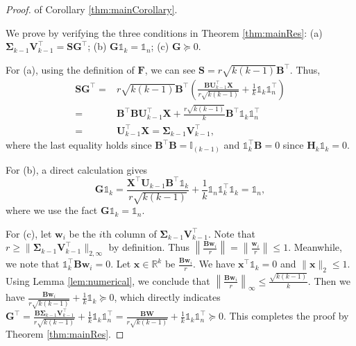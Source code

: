 \documentclass[journal]{IEEEtran}
\begin{document}
\begin{figure}[omitted: a diagram of this paper's results, not reproduced here]\end{figure}

\begin{proof} of Corollary \ref{thm:mainCorollary}.
	
	We prove by verifying the three conditions in Theorem \ref{thm:mainRes}: (a) $\mathbf{\Sigma}_{k-1}\mathbf{V}_{k-1}^\top=\mathbf{S}\mathbf{G}^\top$; 
	(b) $\mathbf{G}\mathbb{1}_k = \mathbb{1}_n$;
	(c) $\mathbf{G}\succeq 0$.
	
	For (a), using the definition of $\mathbf{F}$, we can see $\mathbf{S} = r\sqrt{k(k-1)}\mathbf{B}^\top$.
	Thus, 
	\[
	\begin{aligned}
	\mathbf{SG}^\top =& r\sqrt{k(k-1)}\mathbf{B}^\top \left(\frac{\mathbf{B}\mathbf{U}_{k-1}^\top\mathbf{X}}{r\sqrt{k(k-1)}}+\frac{1}{k}\mathbb{1}_k\mathbb{1}_n^\top\right) \\
	=& \mathbf{B}^\top\mathbf{B}\mathbf{U}_{k-1}^\top\mathbf{X}+\frac{r\sqrt{k(k-1)}}{k}\mathbf{B}^\top\mathbb{1}_k\mathbb{1}_n^\top \\
	=& \mathbf{U}_{k-1}^\top\mathbf{X} = \mathbf{\Sigma}_{k-1}\mathbf{V}_{k-1}^\top,
	\end{aligned}
	\]
	where the last equality holds since $\mathbf{B}^\top\mathbf{B}=\mathbb{I}_{(k-1)}$ and $\mathbb{1}_k^\top\mathbf{B}=0$ since $\mathbf{H}_k \mathbb{1}_k=0$.
	
	
	For (b), a direct calculation gives
	\[
	\mathbf{G}\mathbb{1}_k = \frac{\mathbf{X}^\top \mathbf{U}_{k-1} \mathbf{B}^\top \mathbb{1}_k}{r\sqrt{k(k-1)}}+\frac{1}{k}\mathbb{1}_n\mathbb{1}_k^\top\mathbb{1}_k = \mathbb{1}_n,
	\]
	where we use the fact $\mathbf{G}\mathbb{1}_k = \mathbb{1}_n$.
	
	For (c), let $\mathbf{w}_i$ be the $i$th column of $\mathbf{\Sigma}_{k-1}\mathbf{V}_{k-1}^\top$.
	Note that $r \geq \| \mathbf{\Sigma}_{k-1}\mathbf{V}_{k-1}^\top \|_{2,\infty}$ by definition.
	Thus $\left\| \frac{\mathbf{B} \mathbf{w}_i}{r}\right\| = \left\| \frac{\mathbf{w}_i }{r} \right\| \leq 1$.
	Meanwhile, we note that $\mathbb{1}_k^\top \mathbf{B}\mathbf{w}_i = 0$. 
	Let $\mathbf{x} \in \mathbb{R}^k$ be $\frac{\mathbf{B}\mathbf{w}_i}{r}$.
	We have $\mathbf{x}^\top\mathbb{1}_k = 0$ and $\|\mathbf{x}\|_2\leq 1$.
	Using Lemma \ref{lem:numerical}, we conclude that $\left\|\frac{\mathbf{B}\mathbf{w}_i}{r}\right\|_\infty \leq \frac{\sqrt{k(k-1)}}{k}$.
	Then we have $\frac{\mathbf{B}\mathbf{w}_i}{r\sqrt{k(k-1)}} + \frac{1}{k}\mathbb{1}_k \succeq 0$,
	which directly indicates 
	$\mathbf{G}^\top = \frac{\mathbf{B}\mathbf{\Sigma}_{k-1}\mathbf{V}_{k-1}^\top}{r\sqrt{k(k-1)}} + \frac{1}{k}\mathbb{1}_k\mathbb{1}_n^\top = \frac{\mathbf{B}\mathbf{W}}{r\sqrt{k(k-1)}} + \frac{1}{k}\mathbb{1}_k\mathbb{1}_n^\top \succeq 0$.
	This completes the proof by Theorem \ref{thm:mainRes}.
\end{proof}
\end{document}
